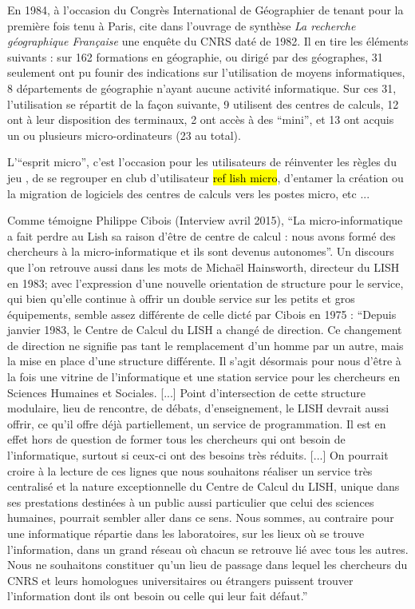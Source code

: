 En 1984, à l'occasion du Congrès International de Géographier de tenant pour la première fois tenu  à Paris, \textcite{Faugieres1984} cite dans l'ouvrage de synthèse \textit{La recherche géographique Française} une enquête du CNRS daté de 1982. Il en tire les éléments suivants : sur 162 formations en géographie, ou dirigé par des géographes, 31 seulement ont pu founir des indications sur l'utilisation de moyens informatiques, 8 départements de géographie n'ayant aucune activité informatique. Sur ces 31, l'utilisation se répartit de la façon suivante, 9 utilisent des centres de calculs, 12 ont à leur disposition des terminaux, 2 ont accès à des \enquote{mini}, et 13 ont acquis un ou plusieurs micro-ordinateurs (23 au total).

L'\enquote{esprit micro}, c'est l'occasion pour les utilisateurs de réinventer les règles du jeu , de se regrouper en club d'utilisateur \hl{ref lish micro}, d'entamer la création ou la migration de logiciels des centres de calculs vers les postes micro, etc ... 

Comme témoigne Philippe Cibois (Interview avril 2015), \enquote{La micro-informatique a fait perdre au Lish sa raison d'être de centre de calcul : nous avons formé des chercheurs à la micro-informatique et ils sont devenus autonomes}. Un discours que l’on retrouve aussi dans les mots de Michaël Hainsworth, directeur du LISH en 1983; avec l’expression d’une nouvelle orientation de structure pour le service, qui bien qu’elle continue à offrir un double service sur les petits et gros équipements, semble assez différente de celle dicté par Cibois en 1975 : \enquote{Depuis janvier 1983, le Centre de Calcul du LISH a changé de direction. Ce changement de direction ne signifie pas tant le remplacement d'un homme par un autre, mais la mise en place d'une structure différente. Il s'agit désormais pour nous d'être à la fois une vitrine de l'informatique et une station service pour les chercheurs en Sciences Humaines et Sociales. [...] Point d'intersection de cette structure modulaire, lieu de rencontre, de débats, d'enseignement, le LISH devrait aussi offrir, ce qu'il offre déjà partiellement, un service de programmation. Il est en effet hors de question de former tous les chercheurs qui ont besoin de l'informatique, surtout si ceux-ci ont des besoins très réduits. [...] On pourrait croire à la lecture de ces lignes que nous souhaitons réaliser un service très centralisé et la nature exceptionnelle du Centre de Calcul du LISH, unique dans ses prestations destinées à un public aussi particulier que celui des sciences humaines, pourrait sembler aller dans ce sens. Nous sommes, au contraire pour une informatique répartie dans les laboratoires, sur les lieux où se trouve l'information, dans un grand réseau où chacun se retrouve lié avec tous les autres. Nous ne souhaitons constituer qu'un lieu de passage dans lequel les chercheurs du CNRS et leurs homologues universitaires ou étrangers puissent trouver l'information dont ils ont besoin ou celle qui leur fait défaut.}

